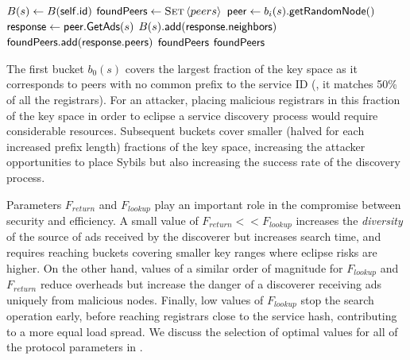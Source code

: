 \begin{algorithm}[]%
    \caption{%
        Lookup algorithm run by discoverers.
    }%
    \label{alg:lookup}%
    \begin{algorithmic}[1]%
         \footnotesize
            \State $B(s) \gets B(\mathsf{self.id})$
            \State $\mathsf{foundPeers} \gets  \textsc{Set}\left \langle peers\right \rangle$
                    \State $\mathsf{peer} \gets b_i(s)\mathsf{.getRandomNode()}$
                    \State $\mathsf{response} \gets \mathsf{peer.GetAds}(s)$
                    \State $B(s)\mathsf{.add}(\mathsf{response.neighbors})$
                    \State $\mathsf{foundPeers.add}(\mathsf{response.peers})$
                        \State \Return $\mathsf{foundPeers}$
                    \EndIf
                \EndFor
            \EndFor
            \State \Return $\mathsf{foundPeers}$
        \EndProcedure
    \end{algorithmic}%
\end{algorithm}%

The first bucket $b_0(s)$ covers the largest fraction of the key space as it corresponds to peers with no common prefix to the service ID (\ie, it matches 50\% of all the registrars).
For an attacker, placing malicious registrars in this fraction of the key space in order to eclipse a service discovery process would require considerable resources.
Subsequent buckets cover smaller (halved for each increased prefix length) fractions of the key space, increasing the attacker opportunities to place Sybils but also increasing the success rate of the discovery process.

Parameters $F_\textit{return}$ and $F_\textit{lookup}$ play an important role in the compromise between security and efficiency.
A small value of $F_\textit{return} << F_\textit{lookup}$ increases the \emph{diversity} of the source of ads received by the discoverer but increases search time, and requires reaching buckets covering smaller key ranges where eclipse risks are higher.
On the other hand, values of a similar order of magnitude for $F_\textit{lookup}$ and $F_\textit{return}$ reduce overheads but increase the danger of a discoverer receiving ads uniquely from malicious nodes.
Finally, low values of $F_\textit{lookup}$ stop the search operation early, before reaching registrars close to the service hash, contributing to a more equal load spread. 
We discuss the selection of optimal values for all of the protocol parameters in . 




